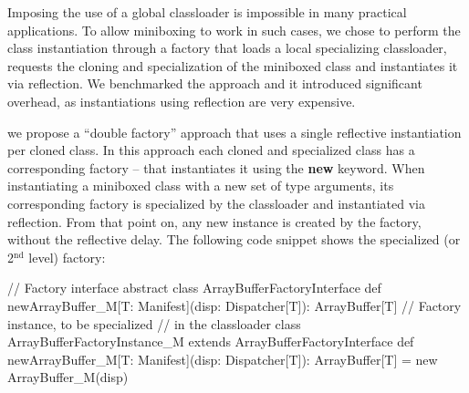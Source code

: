 Imposing the use of a global classloader is impossible in many practical applications. To allow miniboxing to work in such cases, we chose to perform the class instantiation through a factory that loads a local specializing classloader, requests the cloning and specialization of the miniboxed class and instantiates it via reflection. We benchmarked the approach and it introduced significant overhead, as instantiations using reflection are very expensive.

 we propose a ``double factory'' approach that uses a single reflective instantiation per cloned class. In this approach each cloned and specialized class has a corresponding factory -- that instantiates it using the {\bf new} keyword. When instantiating a miniboxed class with a new set of type arguments, its corresponding factory is specialized by the classloader and instantiated via reflection. From that point on, any new instance is created by the factory, without the reflective delay. The following code snippet shows the specialized (or 2$^\text{nd}$ level) factory:

\begin{lstlisting-nobreak}
 // Factory interface
 abstract class ArrayBufferFactoryInterface {
   def newArrayBuffer_M[T: Manifest](disp: Dispatcher[T]): ArrayBuffer[T]
 }
 // Factory instance, to be specialized 
 // in the classloader
 class ArrayBufferFactoryInstance_M extends ArrayBufferFactoryInterface {
   def newArrayBuffer_M[T: Manifest](disp: Dispatcher[T]): ArrayBuffer[T] =
     new ArrayBuffer_M(disp) 
 }
\end{lstlisting-nobreak}     
